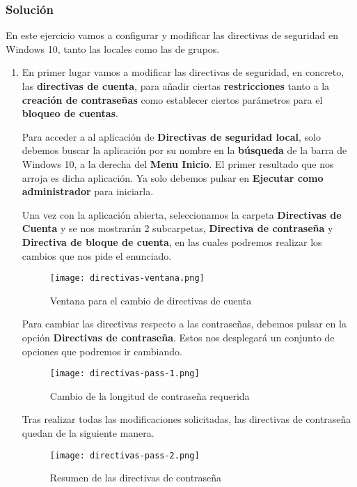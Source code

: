 \subsubsection{Solución}

En este ejercicio vamos a configurar y modificar las directivas de seguridad en Windows 10, tanto las locales como las de grupos.

\begin{enumerate}
    \item En primer lugar vamos a modificar las directivas de seguridad, en concreto, las \textbf{directivas de cuenta}, para añadir ciertas \textbf{restricciones} tanto a la \textbf{creación de contraseñas} como establecer ciertos parámetros para el \textbf{bloqueo de cuentas}.

    Para acceder a al aplicación de \textbf{Directivas de seguridad local}, solo debemos buscar la aplicación por su nombre en la \textbf{búsqueda} de la barra de Windows 10, a la derecha del \textbf{Menu Inicio}. El primer resultado que nos arroja es dicha aplicación. Ya solo debemos pulsar en \textbf{Ejecutar como administrador} para iniciarla.

    Una vez con la aplicación abierta, seleccionamos la carpeta \textbf{Directivas de Cuenta} y se nos mostrarán 2 subcarpetas, \textbf{Directiva de contraseña} y \textbf{Directiva de bloque de cuenta}, en las cuales podremos realizar los cambios que nos pide el enunciado.

    \begin{figure}[H]
        \centering
        \texttt{[image: directivas-ventana.png]}
        \caption{Ventana para el cambio de directivas de cuenta}
    \end{figure}

    Para cambiar las directivas respecto a las contraseñas, debemos pulsar en la opción \textbf{Directivas de contraseña}. Estos nos desplegará un conjunto de opciones que podremos ir cambiando.

    \begin{figure}[H]
        \centering
        \texttt{[image: directivas-pass-1.png]}
        \caption{Cambio de la longitud de contraseña requerida}
    \end{figure}

    Tras realizar todas las modificaciones solicitadas, las directivas de contraseña quedan de la siguiente manera.

    \begin{figure}[H]
        \centering
        \texttt{[image: directivas-pass-2.png]}
        \caption{Resumen de las directivas de contraseña}
    \end{figure}


\end{enumerate}
